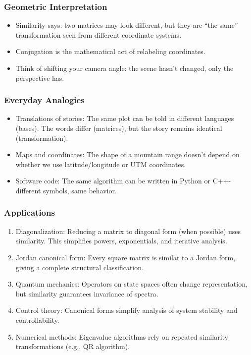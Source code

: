 \documentclass[
  letterpaper,
  DIV=11,
  numbers=noendperiod]{scrreprt}
\providecommand{\tightlist}{%
  \setlength{\itemsep}{0pt}\setlength{\parskip}{0pt}}
\begin{document}
\subsubsection{Geometric
Interpretation}\label{geometric-interpretation-10}

\begin{itemize}
\tightlist
\item
  Similarity says: two matrices may look different, but they are ``the
  same'' transformation seen from different coordinate systems.
\item
  Conjugation is the mathematical act of relabeling coordinates.
\item
  Think of shifting your camera angle: the scene hasn't changed, only
  the perspective has.
\end{itemize}

\subsubsection{Everyday Analogies}\label{everyday-analogies-42}

\begin{itemize}
\tightlist
\item
  Translations of stories: The same plot can be told in different
  languages (bases). The words differ (matrices), but the story remains
  identical (transformation).
\item
  Maps and coordinates: The shape of a mountain range doesn't depend on
  whether we use latitude/longitude or UTM coordinates.
\item
  Software code: The same algorithm can be written in Python or
  C++-different symbols, same behavior.
\end{itemize}

\subsubsection{Applications}\label{applications-9}

\begin{enumerate}
\def\labelenumi{\arabic{enumi}.}
\tightlist
\item
  Diagonalization: Reducing a matrix to diagonal form (when possible)
  uses similarity. This simplifies powers, exponentials, and iterative
  analysis.
\item
  Jordan canonical form: Every square matrix is similar to a Jordan
  form, giving a complete structural classification.
\item
  Quantum mechanics: Operators on state spaces often change
  representation, but similarity guarantees invariance of spectra.
\item
  Control theory: Canonical forms simplify analysis of system stability
  and controllability.
\item
  Numerical methods: Eigenvalue algorithms rely on repeated similarity
  transformations (e.g., QR algorithm).
\end{enumerate}
\end{document}
